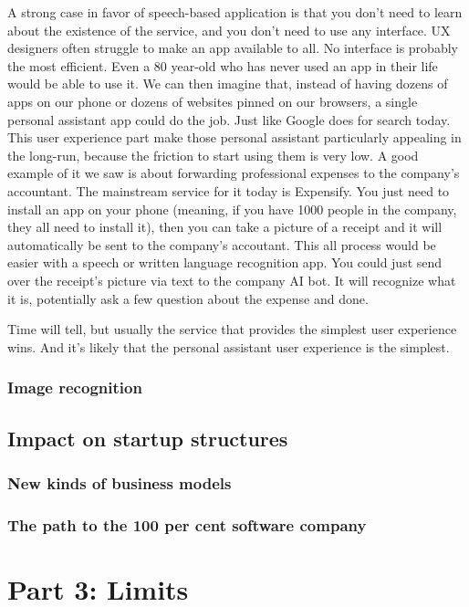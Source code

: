 \documentclass[11pt]{article}
\begin{document}
A strong case in favor of speech-based application is that you don't need to learn about the existence of the service, and you don't need to use any interface. UX designers often struggle to make an app available to all. No interface is probably the most efficient. Even a 80 year-old who has never used an app in their life would be able to use it. 
We can then imagine that, instead of having dozens of apps on our phone or dozens of websites pinned on our browsers, a single personal assistant app could do the job. Just like Google does for search today. This user experience part make those personal assistant particularly appealing in the long-run, because the friction to start using them is very low. 
A good example of it we saw is about forwarding professional expenses to the company's accountant. The mainstream service for it today is Expensify. You just need to install an app on your phone (meaning, if you have 1000 people in the company, they all need to install it), then you can take a picture of a receipt and it will automatically be sent to the company's accoutant. This all process would be easier with a speech or written language recognition app. You could just send over the receipt's picture via text to the company AI bot. It will recognize what it is, potentially ask a few question about the expense and done. 

Time will tell, but usually the service that provides the simplest user experience wins. And it's likely that the personal assistant user experience is the simplest. 


\subsection{Image recognition}

\section{Impact on startup structures}

\subsection{New kinds of business models}

\subsection{The path to the 100 per cent software company}

\chapter{Part 3: Limits}
\end{document}
